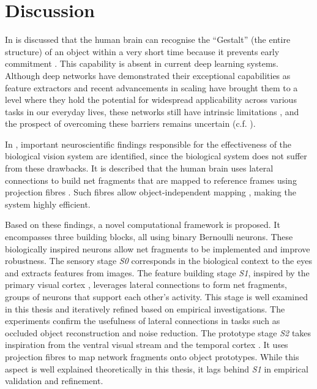 \section{Discussion}
In  is discussed that the human brain can recognise the ``Gestalt'' (the entire structure) of an object within a very short time \cite{ellis_source_1938, kohler_gestalt_1992, wagemans_century_2012, hamlyn_psychology_2017} because it prevents early commitment \cite{marr_vision_2010}.
This capability is absent in current deep learning systems.
Although deep networks have demonstrated their exceptional capabilities as feature extractors and recent advancements in scaling have brought them to a level where they hold the potential for widespread applicability across various tasks in our everyday lives, these networks still have intrinsic limitations \cite{akhtar_threat_2018, long_survey_2022, madan_when_2022, marcus_deep_2018, smith_using_2022, garcia-martin_estimation_2019, kirkpatrick_overcoming_2017, rosenbloom_defining_2023, mitchell_debate_2023}, and the prospect of overcoming these barriers remains uncertain (c.f. ).

In , important neuroscientific findings responsible for the effectiveness of the biological vision system are identified, since the biological system does not suffer from these drawbacks.
It is described that the human brain uses lateral connections  to build net fragments  that are mapped to reference frames using projection fibres .
Such fibres allow object-independent mapping , making the system highly efficient.

Based on these findings, a novel computational framework is proposed.
It encompasses three building blocks, all using binary Bernoulli neurons.
These biologically inspired neurons allow net fragments to be implemented and improve robustness.
The sensory stage \emph{S0} corresponds in the biological context to the eyes and extracts features from images.
The feature building stage \emph{S1}, inspired by the primary visual cortex \cite{tong_primary_2003, grill-spector_human_2004}, leverages lateral connections to form net fragments, groups of neurons that support each other's activity.
This stage is well examined in this thesis and iteratively refined based on empirical investigations.
The experiments confirm the usefulness of lateral connections in tasks such as occluded object reconstruction and noise reduction.
The prototype stage \emph{S2} takes inspiration from the ventral visual stream \cite{goodale_separate_1992} and the temporal cortex \cite{miyashita_inferior_1993, conway_organization_2018}.
It uses projection fibres to map network fragments onto object prototypes. While this aspect is well explained theoretically in this thesis, it lags behind \emph{S1} in empirical validation and refinement.

